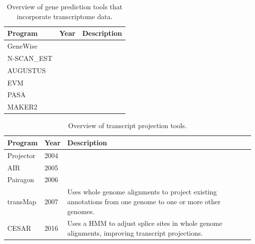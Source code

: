 \documentclass[fleqn,10pt]{wlscirep}
\begin{document}
\begin{table}[ht]
\centering
\begin{tabular}{|l|l|p{12cm}|}
\hline
Program & Year & Description \\
\hline
GeneWise & & \\
\hline
N-SCAN\_EST & & \\
\hline
AUGUSTUS & & \\
\hline
EVM & & \\
\hline
PASA & & \\
\hline
MAKER2 & & \\
\hline
\end{tabular}
\caption{\label{tab:history_prediction}Overview of gene prediction tools that incorporate transcriptome data.}
\end{table}

\begin{table}[ht]
\centering
\begin{tabular}{|l|l|p{12cm}|}
\hline
Program & Year & Description \\
\hline
Projector & 2004 \cite{meyer2004gene} & \\
\hline
AIR & 2005 \cite{florea2005gene} & \\
\hline
Pairagon & 2006 \cite{arumugam2006pairagon+,lu2009pairagon} & \\
\hline
transMap & 2007 \cite{stanke2008using} & Uses whole genome alignments to project existing annotations from one genome to one or more other genomes. \\
\hline
CESAR & 2016 \cite{sharma2016coding} & Uses a HMM to adjust splice sites in whole genome alignments, improving transcript projections. \\
\hline
\end{tabular}
\caption{\label{tab:history_comparative}Overview of transcript projection tools.}
\end{table}
\end{document}
